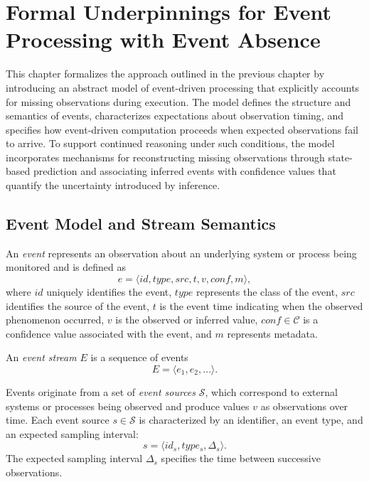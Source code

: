 \chapter{Formal Underpinnings for Event Processing with Event Absence}
\label{ch:model}

This chapter formalizes the approach outlined in the previous chapter by introducing an abstract model of event-driven processing that explicitly accounts for missing observations during execution. The model defines the structure and semantics of events, characterizes expectations about observation timing, and specifies how event-driven computation proceeds when expected observations fail to arrive. To support continued reasoning under such conditions, the model incorporates mechanisms for reconstructing missing observations through state-based prediction and associating inferred events with confidence values that quantify the uncertainty introduced by inference.


\section{Event Model and Stream Semantics}
\label{sec:events-streams}

An \emph{event} represents an observation about an underlying system or process being monitored and is defined as
\begin{equation}
e = \langle id, type, src, t, v, conf, m \rangle ,
\end{equation}
\noindent
where $id$ uniquely identifies the event, $type$ represents the class of the event, $src$ identifies the source of the event, $t$ is the event time indicating when the observed phenomenon occurred, $v$ is the observed or inferred value, $conf \in \mathcal{C}$ is a confidence value associated with the event, and $m$ represents metadata.

An \emph{event stream} $E$ is a sequence of events
\begin{equation}
E = \langle e_1, e_2, \dots \rangle .
\end{equation}

Events originate from a set of \emph{event sources} $\mathcal{S}$, which correspond to external systems or processes being observed and produce values $v$ as observations over time. Each event source $s \in \mathcal{S}$ is characterized by an identifier, an event type, and an expected sampling interval:
\begin{equation}
s = \langle id_s, type_s, \Delta_s \rangle .
\end{equation}
\noindent
The expected sampling interval $\Delta_s$ specifies the time between successive observations.


